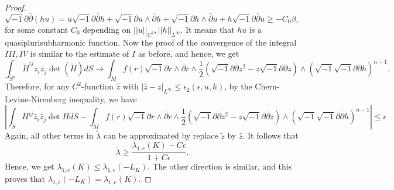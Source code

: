 \documentclass[10pt,a4paper]{amsart}
\newcommand{\ddc}{\sqrt{-1}\partial\bar\partial}
\begin{document}
\begin{proof}
\[\ddc(hu)=u\ddc h+\sqrt{-1}\partial u\wedge\bar{\partial}h+\sqrt{-1}\partial{h}\wedge\bar{\partial}u+h\ddc u\geq -C_0\beta,
\] for some constant $C_0$ depending on $||u||_{C^2},||h||_{L^\infty}$. It means that $hu$ is a quasiplurisubharmonic function. Now the proof of the convergence of the integral $III,IV$ is similar to the estimate of $I$ as before, and hence, we get \[
\int_{S^n}\tilde{H}^{ij}z_iz_j\det(\tilde{H})dS\rightarrow \int_{M}f(r)\sqrt{-1}\partial r\wedge\bar{\partial}r\wedge\frac{1}{2}(\ddc z^2-z\ddc z)\wedge(\sqrt{-1}\ddc h)^{n-1}.
\] Therefore, for any $C^2$-function $\hat{z}$ with $|\hat{z}-z|_{L^\infty}\leq \epsilon_2(\epsilon,u,h)$, by the Chern-Levine-Nirenberg inequality, we have \[\left|
\int_{S}H^{ij}\hat{z}_i\hat{z}_j\det HdS-\int_{M}f(r)\sqrt{-1}\partial r\wedge\bar{\partial}r\wedge\frac{1}{2}(\ddc z^2-z\ddc z)\wedge(\sqrt{-1}\ddc h)^{n-1}\right|\leq \epsilon
\] Again, all other terms in $\tilde{\lambda}$ can be approximated by replace $\tilde{z}$ by $\hat{z}$. 
It follows that \[
\tilde{\lambda}\geq \frac{\lambda_{1,e}(K)-C\epsilon}{1+C\epsilon}.
\]Hence, we get
$\lambda_{1,e}(K)\leq \lambda_{1,e}(-L_K)$. The other direction is similar, and this proves that $\lambda_{1,e}(-L_K)=\lambda_{1,e}(K).$
\end{proof}
\end{document}
